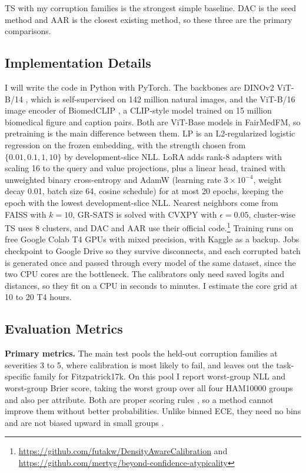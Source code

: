 \documentclass[sigconf,nonacm]{acmart}
\begin{document}
TS with my corruption families is the strongest simple baseline. DAC is the seed method and AAR is the closest existing method, so these three are the primary comparisons.

\subsection{Implementation Details}

I will write the code in Python with PyTorch. The backbones are DINOv2 ViT-B/14 \cite{oquab2024dinov2}, which is self-supervised on 142 million natural images, and the ViT-B/16 image encoder of BiomedCLIP \cite{zhang2025biomedclip}, a CLIP-style model \cite{radford2021clip} trained on 15 million biomedical figure and caption pairs. Both are ViT-Base models \cite{dosovitskiy2021vit} in FairMedFM, so pretraining is the main difference between them. LP is an L2-regularized logistic regression on the frozen embedding, with the strength chosen from $\{0.01, 0.1, 1, 10\}$ by development-slice NLL. LoRA \cite{hu2022lora} adds rank-8 adapters with scaling 16 to the query and value projections, plus a linear head, trained with unweighted binary cross-entropy and AdamW (learning rate $3 \times 10^{-4}$, weight decay 0.01, batch size 64, cosine schedule) for at most 20 epochs, keeping the epoch with the lowest development-slice NLL. Nearest neighbors come from FAISS with $k = 10$, GR-SATS is solved with CVXPY with $\epsilon = 0.05$, cluster-wise TS uses 8 clusters, and DAC and AAR use their official code.\footnote{\url{https://github.com/futakw/DensityAwareCalibration} and \url{https://github.com/mertyg/beyond-confidence-atypicality}} Training runs on free Google Colab T4 GPUs with mixed precision, with Kaggle as a backup. Jobs checkpoint to Google Drive so they survive disconnects, and each corrupted batch is generated once and passed through every model of the same dataset, since the two CPU cores are the bottleneck. The calibrators only need saved logits and distances, so they fit on a CPU in seconds to minutes. I estimate the core grid at 10 to 20 T4 hours.

\subsection{Evaluation Metrics}
\label{sec:metrics}

\textbf{Primary metrics.} The main test pools the held-out corruption families at severities 3 to 5, where calibration is most likely to fail, and leaves out the task-specific family for Fitzpatrick17k. On this pool I report worst-group NLL and worst-group Brier score, taking the worst group over all four HAM10000 groups and also per attribute. Both are proper scoring rules \cite{brier1950verification,gruber2022proper}, so a method cannot improve them without better probabilities. Unlike binned ECE, they need no bins and are not biased upward in small groups \cite{kumar2019verified,roelofs2022mitigating}.
\end{document}
